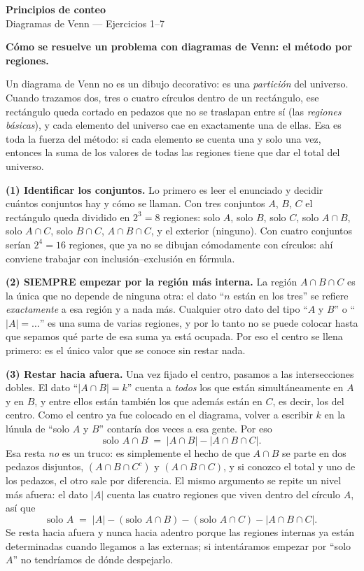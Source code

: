 \documentclass[11pt]{article}
\begin{document}
\begin{center}{\LARGE\bfseries Principios de conteo}\\[2pt]{\large Diagramas de Venn --- Ejercicios 1--7}\end{center}

\vspace{4pt}

\begin{teo}
\textbf{Cómo se resuelve un problema con diagramas de Venn: el método por regiones.}

Un diagrama de Venn no es un dibujo decorativo: es una \emph{partición} del universo. Cuando trazamos
dos, tres o cuatro círculos dentro de un rectángulo, ese rectángulo queda cortado en pedazos que no se
traslapan entre sí (las \emph{regiones básicas}), y cada elemento del universo cae en exactamente una de
ellas. Esa es toda la fuerza del método: si cada elemento se cuenta una y solo una vez, entonces la suma
de los valores de todas las regiones tiene que dar el total del universo.

\medskip
\textbf{(1) Identificar los conjuntos.} Lo primero es leer el enunciado y decidir cuántos conjuntos hay
y cómo se llaman. Con tres conjuntos $A$, $B$, $C$ el rectángulo queda dividido en $2^3=8$ regiones:
solo $A$, solo $B$, solo $C$, solo $A\cap B$, solo $A\cap C$, solo $B\cap C$, $A\cap B\cap C$, y el
exterior (ninguno). Con cuatro conjuntos serían $2^4=16$ regiones, que ya no se dibujan cómodamente
con círculos: ahí conviene trabajar con inclusión--exclusión en fórmula.

\medskip
\textbf{(2) SIEMPRE empezar por la región más interna.} La región $A\cap B\cap C$ es la única que no
depende de ninguna otra: el dato ``$n$ están en los tres'' se refiere \emph{exactamente} a esa región y a
nada más. Cualquier otro dato del tipo ``$A$ y $B$'' o ``$|A|=\dots$'' es una suma de varias regiones, y
por lo tanto no se puede colocar hasta que sepamos qué parte de esa suma ya está ocupada. Por eso el
centro se llena primero: es el único valor que se conoce sin restar nada.

\medskip
\textbf{(3) Restar hacia afuera.} Una vez fijado el centro, pasamos a las intersecciones dobles. El dato
``$|A\cap B| = k$'' cuenta a \emph{todos} los que están simultáneamente en $A$ y en $B$, y entre ellos
están también los que además están en $C$, es decir, los del centro. Como el centro ya fue colocado en el
diagrama, volver a escribir $k$ en la lúnula de ``solo $A$ y $B$'' contaría dos veces a esa gente. Por eso
\[
\text{solo } A\cap B \;=\; |A\cap B| - |A\cap B\cap C|.
\]
Esa resta \emph{no} es un truco: es simplemente el hecho de que $A\cap B$ se parte en dos pedazos
disjuntos, $(A\cap B\cap C^{c})$ y $(A\cap B\cap C)$, y si conozco el total y uno de los pedazos, el otro
sale por diferencia. El mismo argumento se repite un nivel más afuera: el dato $|A|$ cuenta las cuatro
regiones que viven dentro del círculo $A$, así que
\[
\text{solo } A \;=\; |A| - (\text{solo } A\cap B) - (\text{solo } A\cap C) - |A\cap B\cap C|.
\]
Se resta hacia afuera y nunca hacia adentro porque las regiones internas ya están determinadas cuando
llegamos a las externas; si intentáramos empezar por ``solo $A$'' no tendríamos de dónde despejarlo.


\end{teo}
\end{document}
